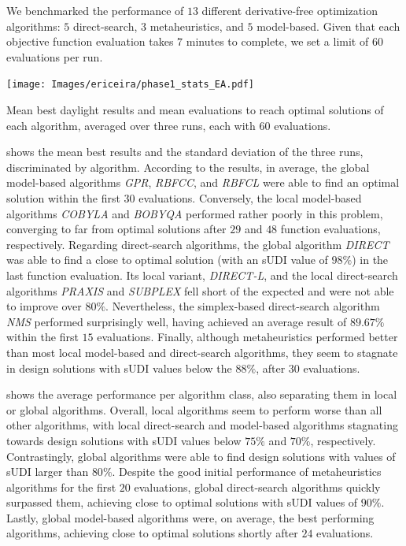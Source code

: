  We benchmarked the performance of $13$ different derivative-free optimization algorithms: $5$ direct-search, $3$ metaheuristics, and $5$ model-based. Given that each objective function evaluation takes $7$ minutes to complete, we set a limit of $60$ evaluations per run.

\begin{table}[]
	\centering
	\texttt{[image: Images/ericeira/phase1\_stats\_EA.pdf]}	
	\caption{Mean best daylight results and mean evaluations to reach optimal solutions of each algorithm, averaged over three runs, each with $60$ evaluations.}
	\label{table:phase1results}
\end{table}

 shows the mean best results and the standard deviation of the three runs, discriminated by algorithm. According to the results, in average, the global model-based algorithms \textit{GPR}, \textit{RBFCC}, and \textit{RBFCL} were able to find an optimal solution within the first $30$ evaluations. Conversely, the local model-based algorithms \textit{\ac{COBYLA}} and \textit{\ac{BOBYQA}} performed rather poorly in this problem, converging to far from optimal solutions after $29$ and $48$ function evaluations, respectively. Regarding direct-search algorithms, the global algorithm \textit{\ac{DIRECT}} was able to find a close to optimal solution (with an \ac{sUDI} value of $98\%$) in the last function evaluation. Its local variant, \textit{\ac{DIRECT}-L}, and the local direct-search algorithms \textit{\ac{PRAXIS}} and \textit{SUBPLEX} fell short of the expected and were not able to improve over $80\%$. Nevertheless, the simplex-based direct-search algorithm \textit{\ac{NMS}} performed surprisingly well, having achieved an average result of $89.67\%$ within the first $15$ evaluations. Finally, although metaheuristics performed better than most local model-based and direct-search algorithms, they seem to stagnate in design solutions with \ac{sUDI} values below the $88\%$, after $30$ evaluations.

 shows the average performance per algorithm class, also separating them in local or global algorithms. Overall, local algorithms seem to perform worse than all other algorithms, with local direct-search and model-based algorithms stagnating towards design solutions with \ac{sUDI} values below $75\%$ and $70\%$, respectively. Contrastingly, global algorithms were able to find design solutions with values of \ac{sUDI} larger than $80\%$. Despite the good initial performance of metaheuristics algorithms for the first $20$ evaluations, global direct-search algorithms quickly surpassed them, achieving close to optimal solutions with \ac{sUDI} values of $90\%$. Lastly, global model-based algorithms were, on average, the best performing algorithms, achieving close to optimal solutions shortly after $24$ evaluations. 

